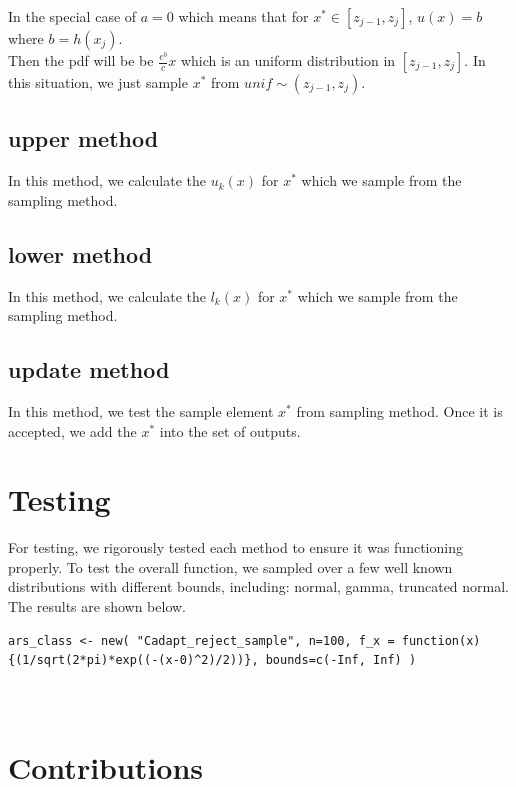 \documentclass[11pt, oneside]{article}   	%
\begin{document}
In the special case of $a=0$ which means that for $x^* \in [z_{j-1}, z_j]$, $u(x) = b $ where $b=h(x_j)$. \\Then the pdf will be  be $ \frac{e^b}{c}x $ which is an uniform distribution in $[z_{j-1}, z_j]$. In this situation, we just sample $x^*$ from $unif \sim  (z_{j-1}, z_j)$.





\subsection*{ upper method }
In this method, we calculate the $u_{k}(x)$ for $x^*$ which we sample from the sampling method.


\subsection*{ lower method }
In this method, we calculate the $l_{k}(x)$ for $x^*$ which we sample from the sampling method.


\subsection*{ update method }
In this method, we test the sample element $x^{*}$ from sampling method. Once it is accepted, we add the $x^{*}$ into the set of outputs.


\section{Testing}

For testing, we rigorously tested each method to ensure it was functioning properly.  To test the overall function, we sampled over a few well known distributions with different bounds, including:  normal, gamma, truncated normal.  The results are shown below.

\begin{lstlisting}[frame=single]
ars_class <- new( "Cadapt_reject_sample", n=100, f_x = function(x){(1/sqrt(2*pi)*exp((-(x-0)^2)/2))}, bounds=c(-Inf, Inf) )



\end{lstlisting}



\section{Contributions}
\end{document}
